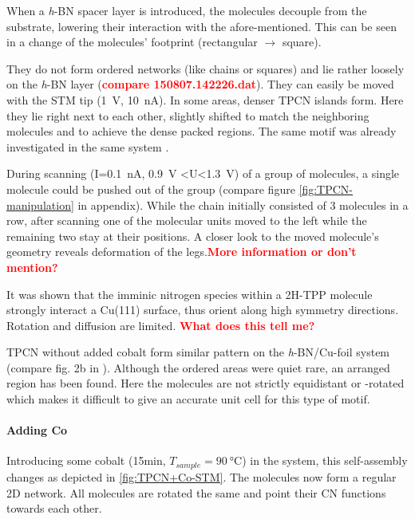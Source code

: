   When a \textit{h}-BN spacer layer is introduced, the molecules decouple from the substrate, lowering their interaction with the afore-mentioned. This can be seen in a change of the molecules' footprint (rectangular $\rightarrow$ square).
  
  They do not form ordered networks (like chains or squares) and lie rather loosely on the \textit{h}-BN layer (\textcolor{red}{\textbf{compare 150807.142226.dat}}). They can easily be moved with the STM tip (\SI{1}{\volt}, \SI{10}{\nano \ampere}). In some areas, denser TPCN islands form. Here they lie right next to each other, slightly shifted to match the neighboring molecules and to achieve the dense packed regions. The same motif was already investigated in the same system \cite{urgel_controlling_2015}.
  
  During scanning (I=\SI{0.1}{\nA}, \SI{0.9}{\V} <U<\SI{1.3}{\V}) of a group of molecules, a single molecule could be pushed out of the group (compare figure \autoref{fig:TPCN-manipulation} in appendix). While the chain initially consisted of 3 molecules in a row, after scanning one of the molecular units moved to the left while the remaining two stay at their positions. A closer look to the moved molecule's geometry reveals deformation of the legs.\textcolor{red}{\textbf{More information or don't mention?}}
  
  It was shown that the imminic nitrogen species within a 2H-TPP molecule strongly interact a Cu(111) surface, thus orient along high symmetry directions.\cite{haq_clean_2011, buchner_diffusion_2011, gonzalez-moreno_following_2011, diller_self-metalation_2012, ditze_activation_2012,rojas_self-assembly_2010} 
  Rotation and diffusion are limited. \textcolor{red}{\textbf{What does this tell me?}}
 
 TPCN without added cobalt form similar pattern on the \textit{h}-BN/Cu-foil system (compare fig. 2b in \cite{urgel_controlling_2015}). Although the ordered areas were quiet rare, an arranged region has been found. Here the molecules are not strictly equidistant or -rotated which makes it difficult to give an accurate unit cell for this type of motif.
  
  \paragraph{Adding Co}
  Introducing some cobalt (15min, $T_{sample}=\SI{90}{\celsius}$) in the system, this self-assembly changes as depicted in \autoref{fig:TPCN+Co-STM}. The molecules now form a regular 2D network. All molecules are rotated the same and point their CN functions towards each other. 
  
